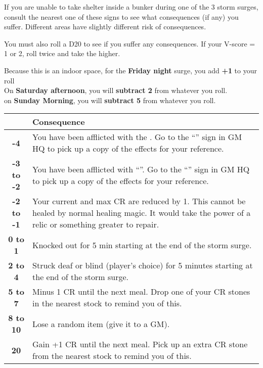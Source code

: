 \documentclass[green]{GL2020}
\begin{document}
\name{\gStormSurgeInside{}}

If you are unable to take shelter inside a bunker during one of the 3 storm surges, consult the nearest one of these signs to see what consequences (if any) you suffer. Different areas have slightly different risk of consequences.

You must also roll a D20 to see if you suffer any consequences. If your V-score = 1 or 2, roll twice and take the higher.

{\large Because this is an indoor space, for the \textbf{Friday night} surge, you add \textbf{+1} to your roll}\\
{\large On \textbf{Saturday afternoon}, you will \textbf{subtract 2} from whatever you roll.}\\
{\large on \textbf{Sunday Morning}, you will \textbf{subtract 5} from whatever you roll.}\\

\begin{tabularx}{\textwidth}{|>{\centering\arraybackslash}c | >{\centering\arraybackslash}X |}
\hline
  {\large Your Total} & {\large Consequence}  \\
\hline
 \textbf{ -4} &  You have been afflicted with the \iSlowActingPoison{}. Go to the ``\sStormSurgeConsequences{}'' sign in GM HQ to pick up a copy of the effects for your reference. \\
\hline
 \textbf{-3 to -2} & You have been afflicted with ``\gBadLuckCurse{}''. Go to the ``\sStormSurgeConsequences{}'' sign in GM HQ to pick up a copy of the effects for your reference. \\
\hline
 \textbf{-2 to -1} & Your current and max CR are reduced by 1. This cannot be healed by normal healing magic. It would take the power of a relic or something greater to repair.  \\
\hline
 \textbf{0 to 1} & Knocked out for 5 min starting at the end of the storm surge.  \\
\hline
  \textbf{2 to 4} & Struck deaf or blind (player’s choice) for 5 minutes starting at the end of the storm surge.  \\
\hline
  \textbf{5 to 7} & Minus 1 CR until the next meal. Drop one of your CR stones in the nearest stock to remind you of this.  \\
\hline
  \textbf{8 to 10} & Lose a random item (give it to a GM).  \\
\hline
 \textbf{20} & Gain +1 CR until the next meal. Pick up an extra CR stone from the nearest stock to remind you of this.  \\
\hline
\end{tabularx}
\end{document}
